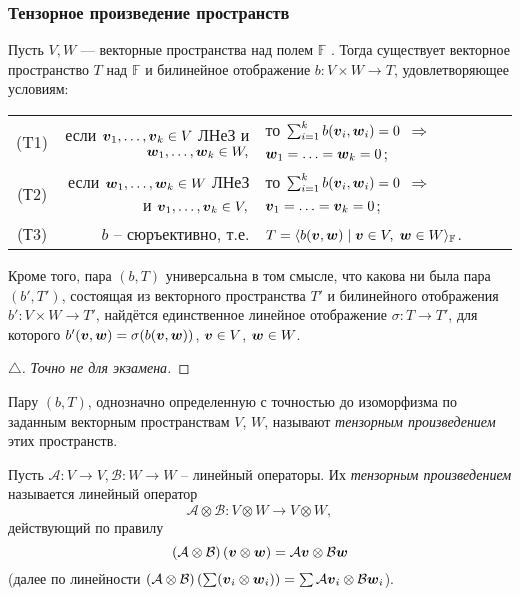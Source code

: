 \subsubsection{Тензорное произведение пространств}
\begin{to_thr} 
    Пусть $V, W$ --- векторные пространства над полем $\mathbb{F}$ . Тогда существует векторное пространство $T$ над $\mathbb{F}$ и билинейное отображение $b \colon V \times W \to T$, удовлетворяющее условиям:

             \begin{tabular}{c|rl}
                (T1) &
                если $\mbox{\boldmath $v$}_{1}, \ldots, \mbox{\boldmath $v$}_k \in V$ ЛНеЗ и $\mbox{\boldmath $w$}_{1}, \ldots, \mbox{\boldmath $w$}_k \in W,$  & 
                то $\sum_{i=1}^k b(\mbox{\boldmath $v$}_i, \mbox{\boldmath $w$}_i) = 0$ $\Longrightarrow$ $\mbox{\boldmath $w$}_{1}=\ldots =\mbox{\boldmath $w$}_k=0$;\\
                (Т2) &
                если $\mbox{\boldmath $w$}_{1}, \ldots, \mbox{\boldmath $w$}_k \in W$ ЛНеЗ и $\mbox{\boldmath $v$}_{1}, \ldots, \mbox{\boldmath $v$}_k \in V,$  & 
                то $\sum_{i=1}^k b(\mbox{\boldmath $v$}_i, \mbox{\boldmath $w$}_i) = 0$ $\Longrightarrow$ $\mbox{\boldmath $v$}_{1}=\ldots =\mbox{\boldmath $v$}_k=0$;\\
                (Т3) &
                $b$ -- сюръективно, т.е. &
                $T = \langle b(\mbox{\boldmath $v$}, \mbox{\boldmath $w$}) \mid \mbox{\boldmath $v$} \in V, \; \mbox{\boldmath $w$} \in W\rangle_{\mathbb{F}}$.
             \end{tabular}
      
      Кроме того, пара $(b, T)$ универсальна в том смысле, что какова ни была пара $(b', T')$, состоящая из векторного пространства $T'$ и билинейного отображения $b' \colon V \times W \to T'$, найдётся единственное линейное отображение $\sigma \colon T \to T'$, для которого $b' (\mbox{\boldmath $v$}, \mbox{\boldmath $w$}) = \sigma (b(\mbox{\boldmath $v$}, \mbox{\boldmath $w$}))$, $\mbox{\boldmath $v$} \in V$, $\mbox{\boldmath $w$} \in W$.
\end{to_thr}


\begin{proof}[$\triangle$]
    \textit{Точно не для экзамена.}
\end{proof}

\begin{to_def} 
    Пару $(b, T)$, однозначно определенную с точностью до изоморфизма по заданным векторным пространствам $V$, $W$, называют \textit{тензорным произведением} этих пространств.
\end{to_def}

\begin{to_def} 
    Пусть $\mathcal A \colon V \to V, \mathcal B \colon W \to W$ -- линейный операторы. Их \textit{тензорным произведением} называется линейный оператор 
    $$
        \mathcal A \otimes \mathcal B \colon V \otimes W \to V \otimes W,
    $$
    действующий по правилу
    $$
        \left(\mathcal A \otimes \mathcal B\right) \left(\mbox{\boldmath $v$} \otimes \mbox{\boldmath $w$}\right) = \mathcal A \mbox{\boldmath $v$} \otimes \mathcal B \mbox{\boldmath $w$}
    $$
    (далее по линейности $\left(\mathcal A \otimes \mathcal B\right) \left( \sum (\mbox{\boldmath $v$}_i \otimes \mbox{\boldmath $w$}_i)\right) = \sum \mathcal A \mbox{\boldmath $v$}_i \otimes \mathcal B \mbox{\boldmath $w$}_i$).
\end{to_def}

